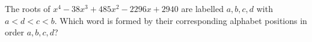 The roots of $x^4-38x^3+485x^2-2296x+2940$ are labelled $a,b,c,d$ with $a<d<c<b$. Which word is formed by their corresponding alphabet positions in order $a,b,c,d$?
